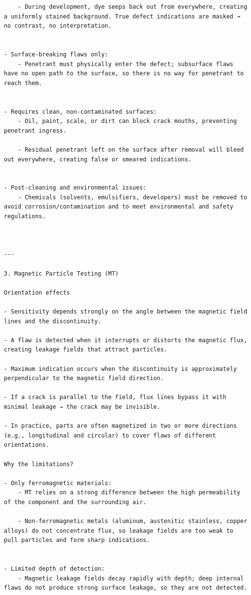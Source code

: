 \documentclass[11pt]{article}
\begin{document}
\begin{verbatim}
	- During development, dye seeps back out from everywhere, creating a uniformly stained background. True defect indications are masked → no contrast, no interpretation.


- Surface-breaking flaws only:
	- Penetrant must physically enter the defect; subsurface flaws have no open path to the surface, so there is no way for penetrant to reach them.


- Requires clean, non-contaminated surfaces:
	- Oil, paint, scale, or dirt can block crack mouths, preventing penetrant ingress.

	- Residual penetrant left on the surface after removal will bleed out everywhere, creating false or smeared indications.


- Post-cleaning and environmental issues:
	- Chemicals (solvents, emulsifiers, developers) must be removed to avoid corrosion/contamination and to meet environmental and safety regulations.



---

3. Magnetic Particle Testing (MT)

Orientation effects

- Sensitivity depends strongly on the angle between the magnetic field lines and the discontinuity.

- A flaw is detected when it interrupts or distorts the magnetic flux, creating leakage fields that attract particles.

- Maximum indication occurs when the discontinuity is approximately perpendicular to the magnetic field direction.

- If a crack is parallel to the field, flux lines bypass it with minimal leakage → the crack may be invisible.

- In practice, parts are often magnetized in two or more directions (e.g., longitudinal and circular) to cover flaws of different orientations.

Why the limitations?

- Only ferromagnetic materials:
	- MT relies on a strong difference between the high permeability of the component and the surrounding air.

	- Non-ferromagnetic metals (aluminum, austenitic stainless, copper alloys) do not concentrate flux, so leakage fields are too weak to pull particles and form sharp indications.


- Limited depth of detection:
	- Magnetic leakage fields decay rapidly with depth; deep internal flaws do not produce strong surface leakage, so they are not detected.



\end{verbatim}
\end{document}
